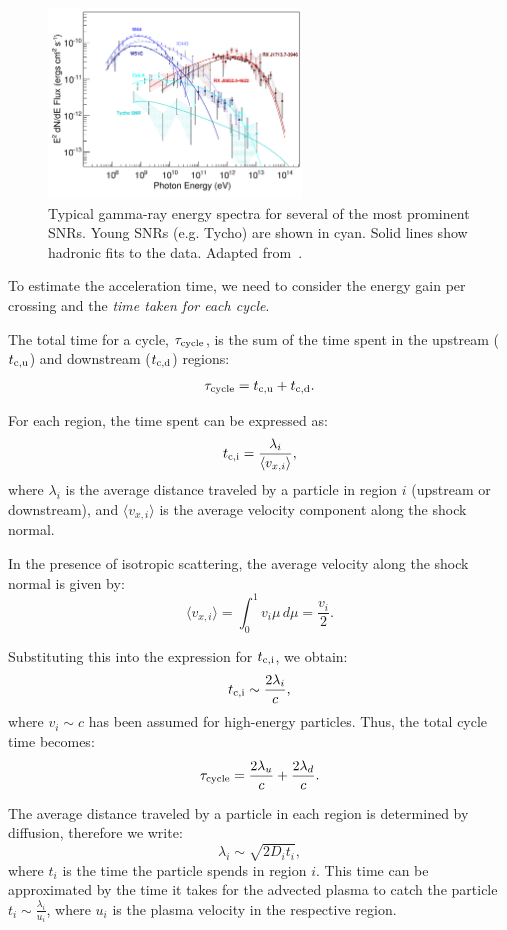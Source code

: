 \begin{figure}[t]
\centering
\includegraphics[width=0.6\textwidth]{figures/SNRspectra.pdf} 
\caption{Typical gamma-ray energy spectra for several of the most prominent SNRs. Young SNRs (e.g. Tycho) are shown in cyan. Solid lines show hadronic fits to the data. Adapted from~\cite{Funk2015}.}
\label{fig:snrspectra}
\end{figure}

To estimate the acceleration time, we need to consider the energy gain per crossing and the \emph{time taken for each cycle}.

The total time for a cycle, \( \tau_{\rm cycle} \), is the sum of the time spent in the upstream (\( t_{\rm c,u} \)) and downstream (\( t_{\rm c,d} \)) regions:
\[
\tau_{\rm cycle} = t_{\rm c,u} + t_{\rm c,d}.
\]

For each region, the time spent can be expressed as:
\[
t_{\rm c, i} = \frac{\lambda_i}{\langle v_{x,i} \rangle},
\]
where \( \lambda_i \) is the average distance traveled by a particle in region \( i \) (upstream or downstream), and \( \langle v_{x,i} \rangle \) is the average velocity component along the shock normal.

In the presence of isotropic scattering, the average velocity along the shock normal is given by:
\[
\langle v_{x,i} \rangle = \int_0^1 v_i \mu \, d\mu = \frac{v_i}{2}.
\]

Substituting this into the expression for \( t_{\rm c,i} \), we obtain:
\[
t_{\rm c, i} \sim \frac{2 \lambda_i}{c},
\]
where \( v_i \sim c \) has been assumed for high-energy particles. Thus, the total cycle time becomes:
\[
\tau_{\rm cycle} = \frac{2\lambda_u}{c} + \frac{2\lambda_d}{c}.
\]

The average distance traveled by a particle in each region is determined by diffusion, therefore we write:
\[
\lambda_i \sim \sqrt{2 D_i t_i},
\]
where \( t_i \) is the time the particle spends in region \( i \). This time can be approximated by the time it takes for the advected plasma to catch the particle \( t_i \sim \frac{\lambda_i}{u_i} \), where \( u_i \) is the plasma velocity in the respective region. 

